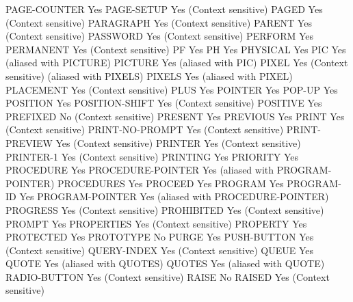 PAGE-COUNTER                    Yes
PAGE-SETUP                      Yes (Context sensitive)
PAGED                           Yes (Context sensitive)
PARAGRAPH                       Yes (Context sensitive)
PARENT                          Yes (Context sensitive)
PASSWORD                        Yes (Context sensitive)
PERFORM                         Yes
PERMANENT                       Yes (Context sensitive)
PF                              Yes
PH                              Yes
PHYSICAL                        Yes
PIC                             Yes (aliased with PICTURE)
PICTURE                         Yes (aliased with PIC)
PIXEL                           Yes (Context sensitive) (aliased with PIXELS)
PIXELS                          Yes (aliased with PIXEL)
PLACEMENT                       Yes (Context sensitive)
PLUS                            Yes
POINTER                         Yes
POP-UP                          Yes
POSITION                        Yes
POSITION-SHIFT                  Yes (Context sensitive)
POSITIVE                        Yes
PREFIXED                        No (Context sensitive)
PRESENT                         Yes
PREVIOUS                        Yes
PRINT                           Yes (Context sensitive)
PRINT-NO-PROMPT                 Yes (Context sensitive)
PRINT-PREVIEW                   Yes (Context sensitive)
PRINTER                         Yes (Context sensitive)
PRINTER-1                       Yes (Context sensitive)
PRINTING                        Yes
PRIORITY                        Yes
PROCEDURE                       Yes
PROCEDURE-POINTER               Yes (aliased with PROGRAM-POINTER)
PROCEDURES                      Yes
PROCEED                         Yes
PROGRAM                         Yes
PROGRAM-ID                      Yes
PROGRAM-POINTER                 Yes (aliased with PROCEDURE-POINTER)
PROGRESS                        Yes (Context sensitive)
PROHIBITED                      Yes (Context sensitive)
PROMPT                          Yes
PROPERTIES                      Yes (Context sensitive)
PROPERTY                        Yes
PROTECTED                       Yes
PROTOTYPE                       No
PURGE                           Yes
PUSH-BUTTON                     Yes (Context sensitive)
QUERY-INDEX                     Yes (Context sensitive)
QUEUE                           Yes
QUOTE                           Yes (aliased with QUOTES)
QUOTES                          Yes (aliased with QUOTE)
RADIO-BUTTON                    Yes (Context sensitive)
RAISE                           No
RAISED                          Yes (Context sensitive)
